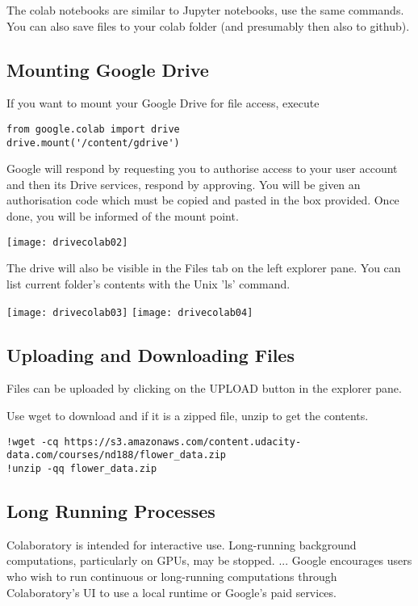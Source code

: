 The colab notebooks are similar to Jupyter notebooks, use the same commands.
You can also save files to your colab folder (and presumably then also to github).

\subsection{Mounting Google Drive}

If you want to mount your Google Drive for file access, execute

\begin{lstlisting}
from google.colab import drive
drive.mount('/content/gdrive')
\end{lstlisting}

Google will respond by requesting you to authorise access to your user account and then its Drive services, respond by approving. You will be given an authorisation code which must be copied and pasted in the box provided. Once done, you will be informed of the mount point.
\begin{marginfigure}
\texttt{[image: drivecolab02]}
\end{marginfigure}
The drive will also be visible in the Files tab on the left explorer pane.  You can list current folder's contents with the Unix 'ls' command.
\begin{marginfigure}
\texttt{[image: drivecolab03]}
\texttt{[image: drivecolab04]}
\end{marginfigure}

\subsection{Uploading and Downloading Files}

Files can be uploaded by clicking on the UPLOAD button in the explorer pane.


Use wget to download and if it is a zipped file, unzip to get the contents.

\begin{lstlisting}
!wget -cq https://s3.amazonaws.com/content.udacity-data.com/courses/nd188/flower_data.zip
!unzip -qq flower_data.zip
\end{lstlisting}

\subsection{Long Running Processes}

Colaboratory is intended for interactive use. Long-running background computations, particularly on GPUs, may be stopped. ... Google encourages users who wish to run continuous or long-running computations through Colaboratory's UI to use a local runtime or Google's paid services.




